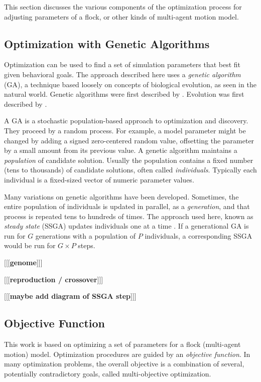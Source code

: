 \documentclass[letterpaper]{article}
\begin{document}
This section discusses the various components of the optimization process for adjusting parameters of a flock, or other kinds of multi-agent motion model.

\subsection{Optimization with Genetic Algorithms}
\label{subsec:Optimization_with_GA}

Optimization can be used to find a set of simulation parameters that best fit given behavioral goals. The approach described here uses a \textit{genetic algorithm} (GA), a technique based loosely on concepts of biological evolution, as seen in the natural world. Genetic algorithms were first described by \citet{holland_adaptation_1975}. Evolution was first described by \citet{darwin_origin_1859}.

A GA is a stochastic population-based approach to optimization and discovery. They proceed by a random process. For example, a model parameter might be changed by adding a signed zero-centered random value, offsetting the parameter by a small amount from its previous value. A genetic algorithm maintains a \textit{population} of candidate solution. Usually the population contains a fixed number (tens to thousands) of candidate solutions, often called \textit{individuals}. Typically each individual is a fixed-sized vector of numeric parameter values.

Many variations on genetic algorithms have been developed. Sometimes, the entire population of individuals is updated in parallel, as a \textit{generation}, and that process is repeated tens to hundreds of times. The approach used here, known as \textit{steady state} (SSGA) updates individuals one at a time \citep{syswerda_study_1991}. If a generational GA is run for $G$ generations with a population of $P$ individuals, a corresponding SSGA would be run for $G{\times}P$ steps.

[[[\textbf{genome}]]]

[[[\textbf{reproduction / crossover}]]]

[[[\textbf{maybe add diagram of SSGA step}]]]


\subsection{Objective Function}
\label{subsec:ObjectiveFunction}

This work is based on optimizing a set of parameters for a flock (multi-agent motion) model. Optimization procedures are guided by an \textit{objective function}. In many optimization problems, the overall objective is a combination of several, potentially contradictory goals, called multi-objective optimization. 
\end{document}
